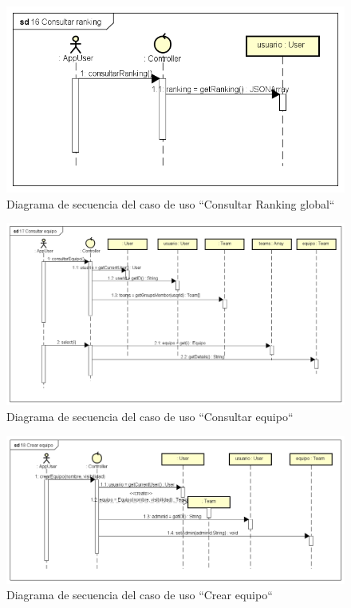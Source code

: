 \documentclass[twoside]{report}
\begin{document}
\begin{figure}[H]
\includegraphics[scale=0.5]{images/sequence/checkRanking}
\caption{Diagrama de secuencia del caso de uso “Consultar Ranking global“}
\end{figure}

\begin{figure}[H]
\includegraphics[scale=0.5]{images/sequence/checkTeam}
\caption{Diagrama de secuencia del caso de uso “Consultar equipo“}
\end{figure}

\begin{figure}[H]
\includegraphics[scale=0.5]{images/sequence/createTeam}
\caption{Diagrama de secuencia del caso de uso “Crear equipo“}
\end{figure}
\end{document}
